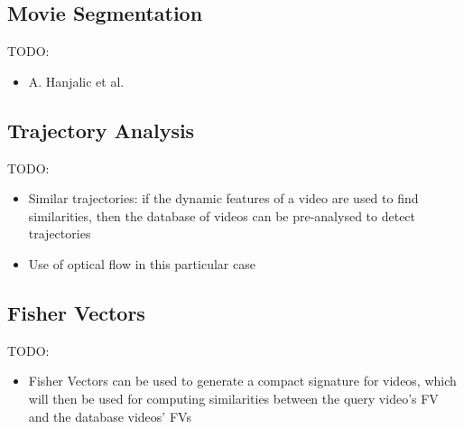 
\subsection{Movie Segmentation}

TODO:
\begin{itemize}
    \item A. Hanjalic et al. \cite{hanjalic1999moviesegmentation}
\end{itemize}


\subsection{Trajectory Analysis}

TODO:
\begin{itemize}
    \item Similar trajectories: if the dynamic features of a video are used to find similarities, then the database of videos can be pre-analysed to detect trajectories \cite{lai2015trajectory}
    \item Use of optical flow in this particular case
\end{itemize}


\subsection{Fisher Vectors}

TODO:
\begin{itemize}
    \item Fisher Vectors can be used to generate a compact signature for videos, which will then be used for computing similarities between the query video's FV and the database videos' FVs \cite{araujo2017i2v}
\end{itemize}